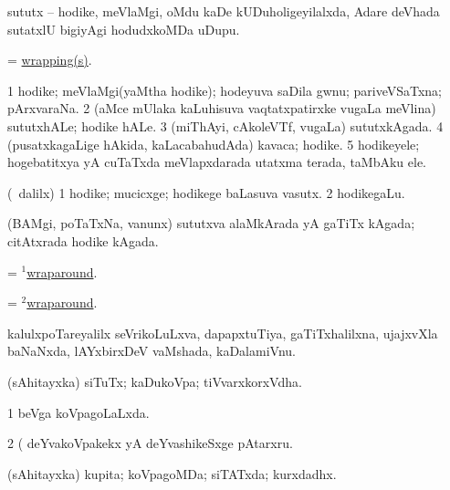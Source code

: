 \begin{center}
\bentry
{} 
\gl{\nA}
\expl{}
\bmng
sututx -- hodike, meVlaMgi, oMdu kaDe kUDuholigeyilalxda, Adare deVhada sutatxlU bigiyAgi hodudxkoMDa uDupu. 
\emng
\eentry

\bentry
{} 
\gl{\nA}
\expl{}
\bmng
= \hyperlink{wrapping}{wrapping(s)}. 
\emng
\eentry

\bentry
{} 
\gl{\nA}
\expl{}
\bmng
\bnum
\num{1} hodike; meVlaMgi(yaMtha hodike); hodeyuva saDila gwnu; pariveVSaTxna; pArxvaraNa. 
\num{2} (aMce mUlaka kaLuhisuva vaqtatxpatirxke \mo vugaLa meVlina) sututxhALe; hodike hALe. 
\num{3} (miThAyi, cAkoleVTf, \mo vugaLa) sututxkAgada. 
\num{4} (pusatxkagaLige hAkida, kaLacabahudAda) kavaca; hodike. 
\num{5} hodikeyele; hogebatitxya yA cuTaTxda meVlapxdarada utatxma terada, taMbAku ele. 
\enum
\emng
\eentry

\bentry
{} 
\gl{\nA}
\expl{}
\bmng
(\kanmu\ \bava dalilx) 
\bnum
\num{1} hodike; mucicxge; hodikege baLasuva vasutx. 
\num{2} hodikegaLu. 
\enum
\emng
\eentry

\bentry
{} 
\gl{\nA}
\expl{}
\bmng
(BAMgi, poTaTxNa, \mo vanunx) sututxva alaMkArada yA gaTiTx kAgada; citAtxrada hodike kAgada. 
\emng
\eentry

\bentry 
{} 
\gl{\nA}
\expl{}
\bmng
= \hyperlink{wraparound(1)}{$^1$wraparound}. 
\emng
\eentry

\bentry 
{} 
\gl{\gu}
\expl{}
\bmng
= \hyperlink{wraparound(2)}{$^2$wraparound}. 
\emng
\eentry

\bentry
{} 
\gl{\nA}
\expl{}
\bmng
kalulxpoTareyalilx seVrikoLuLxva, dapapxtuTiya, gaTiTxhalilxna, ujajxvXla baNaNxda, lAYxbirxDeV vaMshada, kaDalamiVnu. 
\emng
\eentry

\bentry
{} 
\gl{\nA}
\expl{}
\bmng
(sAhitayxka) siTuTx; kaDukoVpa; tiVvarxkorxVdha. 
\emng

\noindent
\gl{\pagu}
\expl{}
\bmng
\bnum
\num{1}  beVga koVpagoLaLxda. 
\num{2}  (  deYvakoVpakekx yA deYvashikeSxge pAtarxru. 
\enum
\emng
\eentry

\bentry
{} 
\gl{\gu}
\expl{}
\bmng
(sAhitayxka) kupita; koVpagoMDa; siTATxda; kurxdadhx. 
\emng
\eentry


\end{center}

